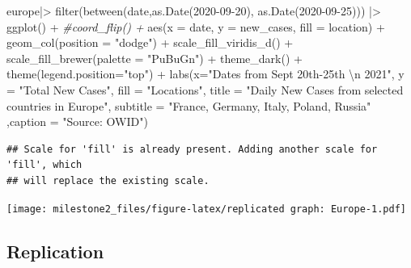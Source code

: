 \documentclass[
]{article}
\newenvironment{Shaded}{\begin{snugshade}}{\end{snugshade}}
\newcommand{\AttributeTok}[1]{\textcolor[rgb]{0.77,0.63,0.00}{#1}}
\newcommand{\CommentTok}[1]{\textcolor[rgb]{0.56,0.35,0.01}{\textit{#1}}}
\newcommand{\FunctionTok}[1]{\textcolor[rgb]{0.00,0.00,0.00}{#1}}
\newcommand{\NormalTok}[1]{#1}
\newcommand{\SpecialCharTok}[1]{\textcolor[rgb]{0.00,0.00,0.00}{#1}}
\newcommand{\StringTok}[1]{\textcolor[rgb]{0.31,0.60,0.02}{#1}}
\begin{document}
\begin{Shaded}
\begin{Highlighting}[]
\NormalTok{europe}\SpecialCharTok{|\textgreater{}}
  \FunctionTok{filter}\NormalTok{(}\FunctionTok{between}\NormalTok{(date,}\FunctionTok{as.Date}\NormalTok{(}\StringTok{\textquotesingle{}2020{-}09{-}20\textquotesingle{}}\NormalTok{), }\FunctionTok{as.Date}\NormalTok{(}\StringTok{\textquotesingle{}2020{-}09{-}25\textquotesingle{}}\NormalTok{))) }\SpecialCharTok{|\textgreater{}}
  \FunctionTok{ggplot}\NormalTok{() }\SpecialCharTok{+}
  \CommentTok{\#coord\_flip() +}
  \FunctionTok{aes}\NormalTok{(}\AttributeTok{x =}\NormalTok{ date, }\AttributeTok{y =}\NormalTok{ new\_cases, }\AttributeTok{fill =}\NormalTok{ location) }\SpecialCharTok{+}
  \FunctionTok{geom\_col}\NormalTok{(}\AttributeTok{position =} \StringTok{"dodge"}\NormalTok{) }\SpecialCharTok{+}
  \FunctionTok{scale\_fill\_viridis\_d}\NormalTok{() }\SpecialCharTok{+}
  \FunctionTok{scale\_fill\_brewer}\NormalTok{(}\AttributeTok{palette =} \StringTok{"PuBuGn"}\NormalTok{) }\SpecialCharTok{+}
  \FunctionTok{theme\_dark}\NormalTok{() }\SpecialCharTok{+}
  \FunctionTok{theme}\NormalTok{(}\AttributeTok{legend.position=}\StringTok{"top"}\NormalTok{) }\SpecialCharTok{+}
   \FunctionTok{labs}\NormalTok{(}\AttributeTok{x=}\StringTok{"Dates from Sept 20th{-}25th }\SpecialCharTok{\textbackslash{}n}\StringTok{ 2021"}\NormalTok{,}
       \AttributeTok{y =} \StringTok{"Total New Cases"}\NormalTok{,}
       \AttributeTok{fill =} \StringTok{"Locations"}\NormalTok{,}
       \AttributeTok{title =} \StringTok{"Daily New Cases from selected countries in Europe"}\NormalTok{,}
       \AttributeTok{subtitle =} \StringTok{"France, Germany, Italy, Poland, Russia"}\NormalTok{ ,}\AttributeTok{caption =} \StringTok{"Source: OWID"}\NormalTok{)}
\end{Highlighting}
\end{Shaded}

\begin{verbatim}
## Scale for 'fill' is already present. Adding another scale for 'fill', which
## will replace the existing scale.
\end{verbatim}

\texttt{[image: milestone2\_files/figure-latex/replicated graph: Europe-1.pdf]}

\hypertarget{replication}{%
\subsection{Replication}\label{replication}}
\end{document}
